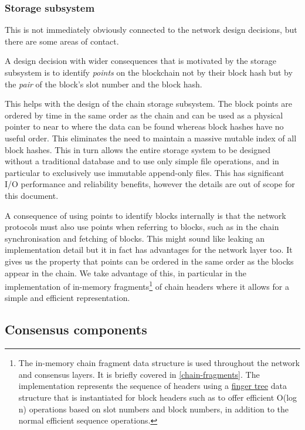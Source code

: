 \documentclass[11pt,a4paper]{article}
\begin{document}
\subsubsection{Storage subsystem}
\label{storage-subsystem}

This is not immediately obviously connected to the network design
decisions, but there are some areas of contact.

A design decision with wider consequences that is motivated by the
storage subsystem is to identify \emph{points} on the blockchain not by
their block hash but by the \emph{pair} of the block's slot number and
the block hash.

This helps with the design of the chain storage subsystem. The block
points are ordered by time in the same order as the chain and can be
used as a physical pointer to near to where the data can be found
whereas block hashes have no useful order. This eliminates the need to
maintain a massive mutable index of all block hashes. This in turn
allows the entire storage system to be designed without a traditional
database and to use only simple file operations, and in particular to
exclusively use immutable append-only files. This has significant I/O
performance and reliability benefits, however the details are out of
scope for this document.

A consequence of using points to identify blocks internally is that the
network protocols must also use points when referring to blocks, such as
in the chain synchronisation and fetching of blocks. This might sound
like leaking an implementation detail but it in fact has advantages for
the network layer too. It gives us the property that points can be
ordered in the same order as the blocks appear in the chain. We take
advantage of this, in particular in the implementation of in-memory
fragments\footnote{The in-memory chain fragment data structure is used
  throughout the network and consensus layers. It is briefly covered in
  \cref{chain-fragments}. The
  implementation represents the sequence of headers using a
  \href{http://www.staff.city.ac.uk/~ross/papers/FingerTree.html}{{finger
  tree}} data structure that is instantiated for block headers such as
  to offer efficient O(log n) operations based on slot numbers and block
  numbers, in addition to the normal efficient sequence operations.} of
chain headers where it allows for a simple and efficient representation.

\subsection{Consensus components}
\label{consensus-components}
\end{document}

